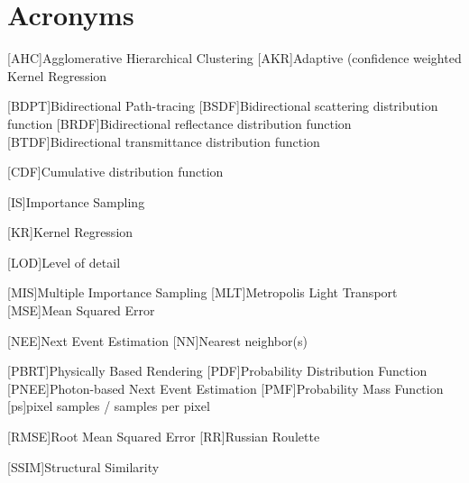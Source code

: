 \chapter*{Acronyms}

\begin{acronym}[ECU]


[AHC]{Agglomerative Hierarchical Clustering}
[AKR]{Adaptive (confidence weighted Kernel Regression}

[BDPT]{Bidirectional Path-tracing}
[BSDF]{Bidirectional scattering distribution function}
[BRDF]{Bidirectional reflectance distribution function}
[BTDF]{Bidirectional transmittance distribution function}

[CDF]{Cumulative distribution function}

[IS]{Importance Sampling}

[KR]{Kernel Regression}

[LOD]{Level of detail}

[MIS]{Multiple Importance Sampling}
[MLT]{Metropolis Light Transport}
[MSE]{Mean Squared Error}


[NEE]{Next Event Estimation}
[NN]{Nearest neighbor(s)}

[PBRT]{Physically Based Rendering}
[PDF]{Probability Distribution Function}
[PNEE]{Photon-based Next Event Estimation}
[PMF]{Probability Mass Function}
[ps]{pixel samples / samples per pixel}

[RMSE]{Root Mean Squared Error}
[RR]{Russian Roulette}

[SSIM]{Structural Similarity}

\end{acronym}
